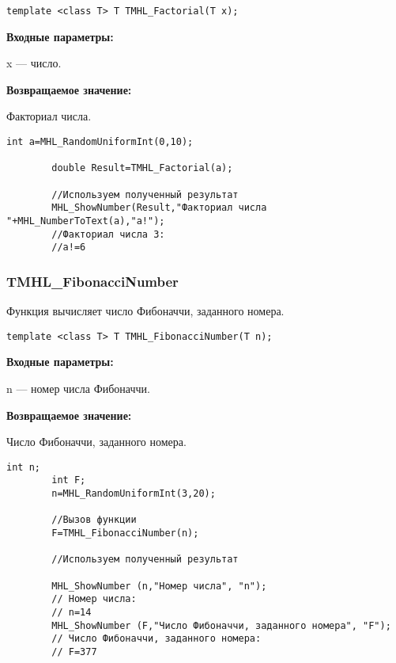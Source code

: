 \documentclass[a4paper,12pt]{article}
\begin{document}
\begin{lstlisting}[label=code_syntax_TMHL_Factorial,caption=Синтаксис]
template <class T> T TMHL_Factorial(T x);
\end{lstlisting}

\textbf{Входные параметры:}  
 
 x --- число.

\textbf{Возвращаемое значение:}

 Факториал числа.


\begin{lstlisting}[label=code_use_TMHL_Factorial,caption=Пример использования]
        int a=MHL_RandomUniformInt(0,10);

        double Result=TMHL_Factorial(a);

        //Используем полученный результат
        MHL_ShowNumber(Result,"Факториал числа "+MHL_NumberToText(a),"a!");
        //Факториал числа 3:
        //a!=6
\end{lstlisting}

\subsubsection{TMHL\_FibonacciNumber}\label{TMHL_FibonacciNumber}

Функция вычисляет число Фибоначчи, заданного номера.


\begin{lstlisting}[label=code_syntax_TMHL_FibonacciNumber,caption=Синтаксис]
template <class T> T TMHL_FibonacciNumber(T n);
\end{lstlisting}

\textbf{Входные параметры:}  
 
 n --- номер числа Фибоначчи.

\textbf{Возвращаемое значение:}
 
 Число Фибоначчи, заданного номера.


\begin{lstlisting}[label=code_use_TMHL_FibonacciNumber,caption=Пример использования]
        int n;
        int F;
        n=MHL_RandomUniformInt(3,20);

        //Вызов функции
        F=TMHL_FibonacciNumber(n);

        //Используем полученный результат

        MHL_ShowNumber (n,"Номер числа", "n");
        // Номер числа:
        // n=14
        MHL_ShowNumber (F,"Число Фибоначчи, заданного номера", "F");
        // Число Фибоначчи, заданного номера:
        // F=377
\end{lstlisting}
\end{document}
